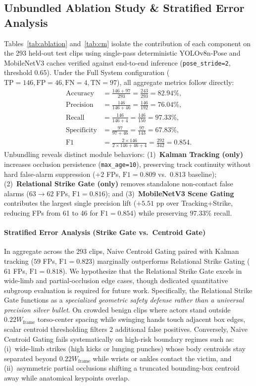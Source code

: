 \documentclass[conference]{IEEEtran}
\begin{document}
\subsection{Unbundled Ablation Study \& Stratified Error Analysis}
Tables~\ref{tab:ablation} and~\ref{tab:cm} isolate the contribution of each component on the 293 held-out test clips using single-pass deterministic YOLOv8n-Pose and MobileNetV3 caches verified against end-to-end inference (\texttt{pose\_stride=2}, threshold $0.65$). Under the Full System configuration ($\text{TP}=146, \text{FP}=46, \text{FN}=4, \text{TN}=97$), all aggregate metrics follow directly:
\begin{align}
\text{Accuracy} &= \frac{146 + 97}{293} = \frac{243}{293} = 82.94\%, \\
\text{Precision} &= \frac{146}{146 + 46} = \frac{146}{192} = 76.04\%, \\
\text{Recall} &= \frac{146}{146 + 4} = \frac{146}{150} = 97.33\%, \\
\text{Specificity} &= \frac{97}{97 + 46} = \frac{97}{143} = 67.83\%, \\
\text{F1} &= \frac{2 \times 146}{2 \times 146 + 46 + 4} = \frac{292}{342} = 0.854.
\end{align}
Unbundling reveals distinct module behaviors: (1)~\textbf{Kalman Tracking (only)} increases occlusion persistence (\texttt{max\_age=10}), preserving track continuity without hard false-alarm suppression ($+2$ FPs, $\text{F1}=0.809$ vs.~$0.813$ baseline); (2)~\textbf{Relational Strike Gate (only)} removes standalone non-contact false alarms ($63 \to 62$ FPs, $\text{F1}=0.816$); and (3)~\textbf{MobileNetV3 Scene Gating} contributes the largest single precision lift ($+5.51\text{ pp}$ over Tracking+Strike, reducing FPs from 61 to 46 for $\text{F1}=0.854$) while preserving $97.33\%$ recall.

\paragraph*{Stratified Error Analysis (Strike Gate vs.~Centroid Gate)}
In aggregate across the 293 clips, Naive Centroid Gating paired with Kalman tracking ($59$ FPs, $\text{F1}=0.823$) marginally outperforms Relational Strike Gating ($61$ FPs, $\text{F1}=0.818$). We hypothesize that the Relational Strike Gate excels in wide-limb and partial-occlusion edge cases, though dedicated quantitative subgroup evaluation is required for future work. Specifically, the Relational Strike Gate functions as a \textit{specialized geometric safety defense rather than a universal precision silver bullet}. On crowded benign clips where actors stand outside $0.22 W_{\text{frame}}$ torso-center spacing while swinging hands touch adjacent box edges, scalar centroid thresholding filters 2 additional false positives. Conversely, Naive Centroid Gating fails systematically on high-risk boundary regimes such as: (i)~wide-limb strikes (high kicks or lunging punches) whose body centroids stay separated beyond $0.22 W_{\text{frame}}$ while wrists or ankles contact the victim, and (ii)~asymmetric partial occlusions shifting a truncated bounding-box centroid away while anatomical keypoints overlap.
\end{document}
